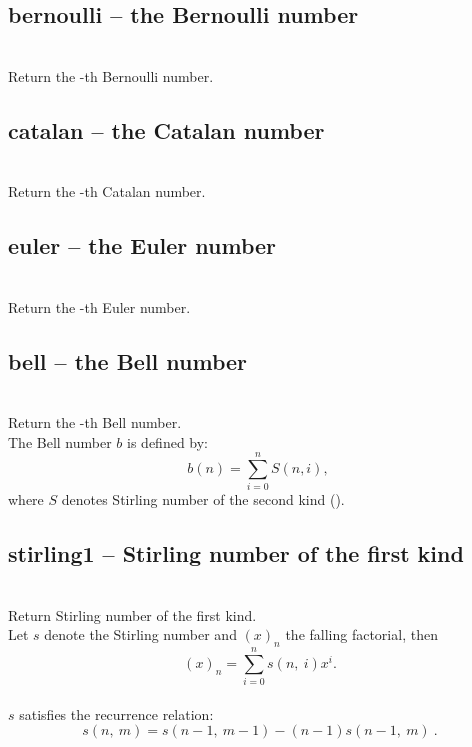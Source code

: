   \subsection{bernoulli -- the Bernoulli number}
   \\
   \spacing
   \quad Return the -th Bernoulli number.\\

  \subsection{catalan -- the Catalan number}
   \\
   \spacing
   \quad Return the -th Catalan number.\\

  \subsection{euler -- the Euler number}
   \\
   \spacing
   \quad Return the -th Euler number.\\

  \subsection{bell -- the Bell number}
   \\
   \spacing
   \quad Return the -th Bell number.\\
   \spacing
   \quad The Bell number \(b\) is defined by:
   \[b(n) = \sum_{i=0}^{n} S(n, i),\ \]
   where \(S\) denotes Stirling number of the second kind ().\\

  \subsection{stirling1 -- Stirling number of the first kind}
   \\
   \spacing
   \quad Return Stirling number of the first kind.\\
   \spacing
   \quad Let \(s\) denote the Stirling number and \((x)_n\) the falling factorial, then
   \[(x)_n = \sum_{i=0}^{n} s(n,\ i) x^i. \]\\
   \(s\) satisfies the recurrence relation:
   \[s(n,\ m) = s(n-1,\ m-1) - (n-1)s(n-1,\ m)\ .\]\\

